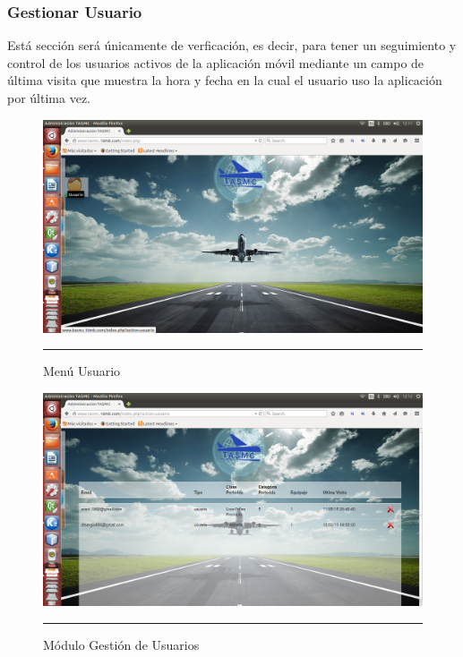 \subsubsection{Gestionar Usuario}
Está sección será únicamente de verficación, es decir, para tener un seguimiento y control de los usuarios activos de la aplicación móvil 
mediante un campo de última visita que muestra la hora y fecha en la cual el usuario uso la aplicación por última vez.
\begin{figure}[h!]
	\centering
		\includegraphics[width=1\textwidth]{Figuras/indexUsuario.png}
		\rule{35em}{0.5pt}
	\caption[Menú Usuario]{Menú Usuario}
	\label{fig:menuUsuario}
\end{figure}
\begin{figure}[h!]
	\centering
		\includegraphics[width=1\textwidth]{Figuras/usuarios.png}
		\rule{35em}{0.5pt}
	\caption[Módulo Gestión de Usuarios]{Módulo Gestión de Usuarios}
	\label{fig:moduloUsuarios}
\end{figure}
\clearpage


